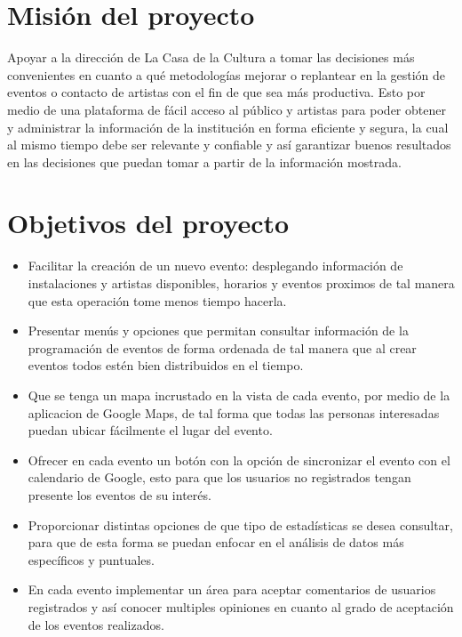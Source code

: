\documentclass[letterpaper,11pt,spanish]{sphinxmanual}
\begin{document}
\section{Misión del proyecto}
\label{objetivos:mision-del-proyecto}
Apoyar a la dirección de La Casa de la Cultura a tomar las decisiones más convenientes
en cuanto a qué metodologías mejorar o replantear en la gestión de eventos o contacto de artistas
con el fin de que sea más productiva. Esto por medio de una plataforma de fácil acceso
al público y artistas para poder obtener y administrar la información de la institución
en forma eficiente y segura, la cual al mismo tiempo debe ser relevante y confiable y así
garantizar buenos resultados en las decisiones que puedan tomar a partir de la información mostrada.


\section{Objetivos del proyecto}
\label{objetivos:objetivos-del-proyecto}\begin{itemize}
\item {} 
Facilitar la creación de un nuevo evento: desplegando información de instalaciones
y artistas disponibles, horarios y eventos proximos de tal manera que esta operación
tome menos tiempo hacerla.

\item {} 
Presentar menús y opciones que permitan consultar información de la programación
de eventos de forma ordenada de tal manera que al crear eventos todos estén bien
distribuidos en el tiempo.

\item {} 
Que se tenga un mapa incrustado en la vista de cada evento, por medio de la aplicacion de
Google Maps, de tal forma que todas las personas interesadas puedan ubicar fácilmente el
lugar del evento.

\item {} 
Ofrecer en cada evento un botón con la opción de sincronizar el evento con el calendario de
Google, esto para que los usuarios no registrados tengan presente los eventos de su interés.

\item {} 
Proporcionar distintas opciones de que tipo de estadísticas se desea consultar, para que
de esta forma se puedan enfocar en el análisis de datos más específicos y puntuales.

\item {} 
En cada evento implementar un área para aceptar comentarios de usuarios registrados y así
conocer multiples opiniones en cuanto al grado de aceptación de los eventos realizados.

\end{itemize}
\end{document}
